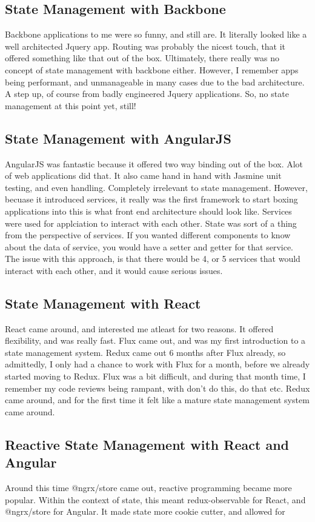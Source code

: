 \subsection{ State Management with Backbone }
Backbone applications to me were so funny, and still are. It literally looked
like a well architected Jquery app. Routing was probably the nicest touch, that
it offered something like that out of the box. Ultimately, there really was no
concept of state management with backbone either. However, I remember apps being
performant, and unmanageable in many cases due to the bad architecture. A step
up, of course from badly engineered Jquery applications. So, no state management
at this point yet, still!

\subsection{ State Management with AngularJS }
AngularJS was fantastic because it offered two way binding out of the box. Alot
of web applications did that. It also came hand in hand with Jasmine unit testing,
and even handling. Completely irrelevant to state management. However, becuase
it introduced services, it really was the first framework to start boxing
applications into this is what front end architecture should look like. Services
were used for applciation to interact with each other. State was sort of a thing
from the perspective of services. If you wanted different components to know
about the data of service, you would have a setter and getter for that service.
The issue with this approach, is that there would be 4, or 5 services that would
interact with each other, and it would cause serious issues.

\subsection{ State Management with React }
React came around, and interested me atleast for two reasons. It offered
flexibility, and was really fast. Flux came out, and was my first introduction
to a state management system. Redux came out 6 months after Flux already, so
admittedly, I only had a chance to work with Flux for a month, before we already
started moving to Redux. Flux was a bit difficult, and during that month time,
I remember my code reviews being rampant, with don't do this, do that etc. Redux
came around, and for the first time it felt like a mature state management
system came around.

\subsection{ Reactive State Management with React and Angular }
Around this time @ngrx/store came out, reactive programming became more popular.
Within the context of state, this meant redux-observable for React, and
@ngrx/store for Angular. It made state more cookie cutter, and allowed for

